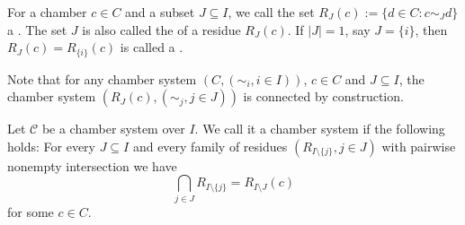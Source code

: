 \begin{defi}
	For a chamber $c \in C$ and a subset $J \subseteq I$, we call the set $R_J(c) := \{ d \in C : c \sim_J d \}$ a . The set $J$ is also called the  of a residue $R_J(c)$. If $|J| = 1$, say $J = \{i\}$, then $R_J(c) = R_{\{i\}}(c)$ is called a .
\end{defi}

Note that for any chamber system $(C,(\sim_i, i \in I))$, $c \in C$ and $J \subseteq I$, the chamber system $(R_J(c), (\sim_j, j \in J))$ is connected by construction.

\begin{defi}
	Let $\mathcal{C}$ be a chamber system over $I$. We call it a  chamber system if the following holds: For every $J \subseteq I$ and every family of residues $(R_{I \setminus \{j\}}, j \in J)$ with pairwise nonempty intersection we have
	$$ \bigcap_{j \in J} R_{I \setminus \{j\}} = R_{I \setminus J}(c) $$
	for some $c \in C$.
\end{defi}